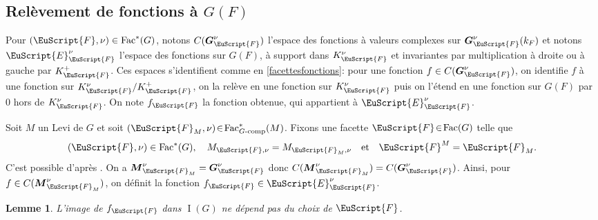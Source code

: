 \documentclass[JEP,XML,SOM,Unicode,francais]{cedram}
\let\mathcal \EuScript
\newcommand{\quadet}{\quad\text{et}\quad}
\newcommand{\tcomp}{\textup{-comp}}
\newcommand{\Fac}{\mathrm{Fac}}
\DeclareMathOperator{\rI}{I}
\newcommand{\bG}{\boldsymbol{G}}
\newcommand{\bM}{\boldsymbol{M}}
\newcommand{\cE}{\mathcal{E}}
\newcommand{\cF}{\mathcal{F}}
\theoremstyle{plain}
\newtheorem*{lem*}{Lemme}
\theoremstyle{definition}
\begin{document}
\subsection{Relèvement de fonctions à \texorpdfstring{$G(F)$}{GF}}\label{relevement}
Pour $(\cF,\nu)\in \Fac^*(G)$, notons $C(\bG_{\cF}^{\nu})$ l'espace des fonctions à valeurs complexes sur $\bG_{\cF}^{\nu}(k_{F})$ et notons $\cE_{\cF}^{\nu}$ l'espace des fonctions sur $G(F)$, à support dans $K_{\cF}^{\nu}$ et invariantes par multiplication à droite ou à gauche par $K_{\cF}^+$. Ces espaces s'identifient comme en \ref{facettesfonctions}: pour une fonction $f\in C(\bG_{\cF}^{\nu})$, on identifie $f$ à une fonction sur $K_{\cF}^{\nu}/K_{\cF}^+$, on la relève en une fonction sur $K_{\cF}^{\nu}$ puis on l'étend en une fonction sur $G(F)$ par $0$ hors de $K_{\cF}^{\nu}$. On note $f_{\cF}$ la fonction obtenue, qui appartient à $\cE_{\cF}^{\nu}$.

Soit $M$ un Levi de $G$ et soit $(\cF_{M},\nu)\!\in\!\Fac^*_{G\tcomp}(M)$. Fixons une facette $\cF\!\in\!\Fac(G)$ telle que
\[
(\cF,\nu)\in \Fac^*(G),\quad M_{\cF,\nu}=M_{\cF_{M},\nu}\quadet \cF^M=\cF_{M}.
\]
C'est possible d'après \cite[Lem.\,6\,\&\,7]{W2}. On a $\bM_{\cF_{M}}^{\nu}=\bG_{\cF}^{\nu}$ donc $C(\bM_{\cF_{M}}^{\nu})=C(\bG_{\cF}^{\nu})$. Ainsi, pour $f\in C(\bM_{\cF_{M}}^{\nu})$, on définit la fonction $f_{\cF}\in \cE_{\cF}^{\nu}$.

\begin{lem*}
L'image de $f_{\cF}$ dans $\rI(G)$ ne dépend pas du choix de $\cF$.\end{lem*}
\end{document}
